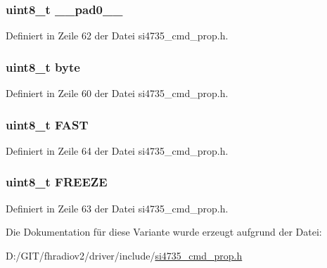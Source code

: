 \subsubsection[{\+\_\+\+\_\+pad0\+\_\+\+\_\+}]{\setlength{\rightskip}{0pt plus 5cm}uint8\+\_\+t \+\_\+\+\_\+pad0\+\_\+\+\_\+}\label{unionfm__tune__freq__arg1_a8b4eebe79ded0459acec2f4950102ba3}


Definiert in Zeile 62 der Datei si4735\+\_\+cmd\+\_\+prop.\+h.

\hypertarget{unionfm__tune__freq__arg1_a96f44d20f1dbf1c8785a7bc99a46164c}{}
\subsubsection[{byte}]{\setlength{\rightskip}{0pt plus 5cm}uint8\+\_\+t byte}\label{unionfm__tune__freq__arg1_a96f44d20f1dbf1c8785a7bc99a46164c}


Definiert in Zeile 60 der Datei si4735\+\_\+cmd\+\_\+prop.\+h.

\hypertarget{unionfm__tune__freq__arg1_a9c324e733ff424944c675beaff57049d}{}
\subsubsection[{F\+A\+S\+T}]{\setlength{\rightskip}{0pt plus 5cm}uint8\+\_\+t F\+A\+S\+T}\label{unionfm__tune__freq__arg1_a9c324e733ff424944c675beaff57049d}


Definiert in Zeile 64 der Datei si4735\+\_\+cmd\+\_\+prop.\+h.

\hypertarget{unionfm__tune__freq__arg1_af55f9b26a88028338a2a761649cf5407}{}
\subsubsection[{F\+R\+E\+E\+Z\+E}]{\setlength{\rightskip}{0pt plus 5cm}uint8\+\_\+t F\+R\+E\+E\+Z\+E}\label{unionfm__tune__freq__arg1_af55f9b26a88028338a2a761649cf5407}


Definiert in Zeile 63 der Datei si4735\+\_\+cmd\+\_\+prop.\+h.



Die Dokumentation für diese Variante wurde erzeugt aufgrund der Datei\+:\begin{DoxyCompactItemize}
\item 
D\+:/\+G\+I\+T/fhradiov2/driver/include/\hyperlink{si4735__cmd__prop_8h}{si4735\+\_\+cmd\+\_\+prop.\+h}\end{DoxyCompactItemize}
